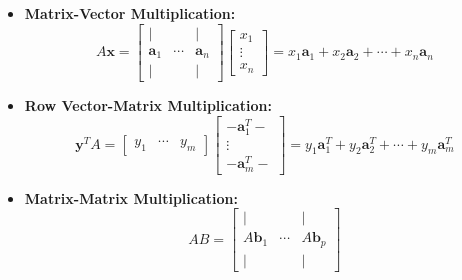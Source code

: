 \documentclass{article}
\begin{document}
\begin{itemize}
    \item \textbf{Matrix-Vector Multiplication:}
    \begin{equation}
        A\mathbf{x} =
        \left[
            \begin{array}{ccc}
                | &        & | \\
                \mathbf{a}_1 & \cdots & \mathbf{a}_n \\
                | &        & |
            \end{array}
        \right]
        \left[
            \begin{array}{c}
                x_1 \\
                \vdots \\
                x_n
            \end{array}
        \right]
        =
        x_1\mathbf{a}_1 + x_2\mathbf{a}_2 + \cdots + x_n\mathbf{a}_n
        \label{eq:matvec}
    \end{equation}

    \item \textbf{Row Vector-Matrix Multiplication:}
    \begin{equation}
        \mathbf{y}^T A =
        \left[
            \begin{array}{ccc}
                y_1 & \cdots & y_m
            \end{array}
        \right]
        \left[
            \begin{array}{c}
                - \mathbf{a}_1^T - \\
                \vdots \\
                - \mathbf{a}_m^T -
            \end{array}
        \right]
        =
        y_1\mathbf{a}_1^T + y_2\mathbf{a}_2^T + \cdots + y_m\mathbf{a}_m^T
        \label{eq:rowvecmat}
    \end{equation}

    \item \textbf{Matrix-Matrix Multiplication:}
    \begin{equation}
        AB =
        \left[
            \begin{array}{ccc}
                | &        & | \\
                A\mathbf{b}_1 & \cdots & A\mathbf{b}_p \\
                | &        & |
            \end{array}
        \right]
        \label{eq:mul}
    \end{equation}


\end{itemize}
\end{document}
